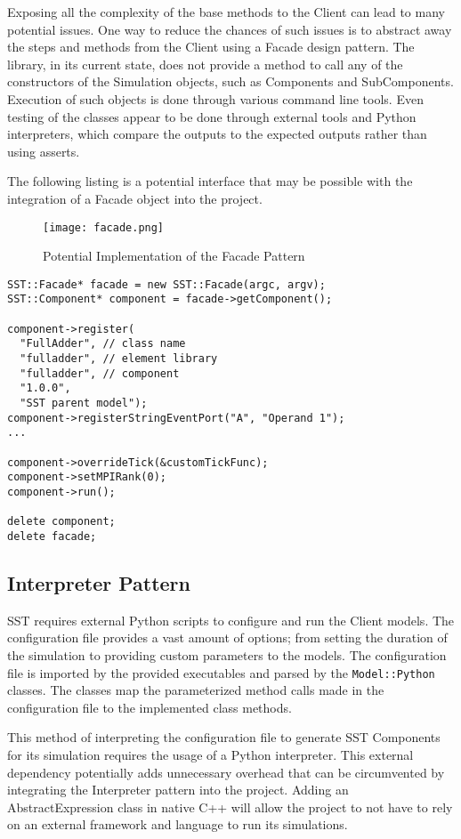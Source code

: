 Exposing all the complexity of the base methods to the Client can lead to many potential issues. One way to reduce the chances of such issues is to abstract away the steps and methods from the Client using a Facade design pattern. The library, in its current state, does not provide a method to call any of the constructors of the Simulation objects, such as Components and SubComponents. Execution of such objects is done through various command line tools. Even testing of the classes appear to be done through external tools and Python interpreters, which compare the outputs to the expected outputs rather than using asserts.

The following listing is a potential interface that may be possible with the integration of a Facade object into the project.


\begin{figure}[h]
  \caption{Potential Implementation of the Facade Pattern}
  \centering
  \texttt{[image: facade.png]}
\end{figure}


\begin{lstlisting}[style=customC++,label=facade,caption=Potential Implementation of Facade]
SST::Facade* facade = new SST::Facade(argc, argv);
SST::Component* component = facade->getComponent();

component->register(
  "FullAdder", // class name
  "fulladder", // element library
  "fulladder", // component
  "1.0.0",
  "SST parent model");
component->registerStringEventPort("A", "Operand 1");
...

component->overrideTick(&customTickFunc);
component->setMPIRank(0);
component->run();

delete component;
delete facade;
\end{lstlisting}

\newpage
\subsection{Interpreter Pattern}
SST requires external Python scripts to configure and run the Client models. The configuration file provides a vast amount of options; from setting the duration of the simulation to providing custom parameters to the models. The configuration file is imported by the provided executables and parsed by the \texttt{Model::Python} classes. The classes map the parameterized method calls made in the configuration file to the implemented class methods.

This method of interpreting the configuration file to generate SST Components for its simulation requires the usage of a Python interpreter. This external dependency potentially adds unnecessary overhead that can be circumvented by integrating the Interpreter pattern into the project. Adding an AbstractExpression class in native C++ will allow the project to not have to rely on an external framework and language to run its simulations.


